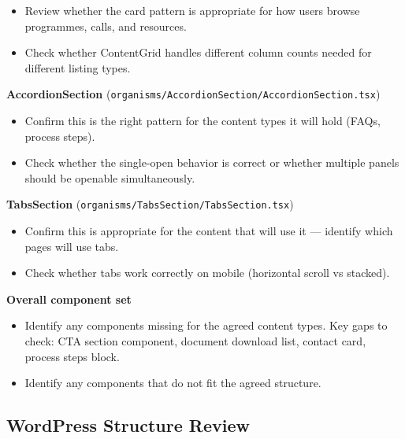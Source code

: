 \documentclass[12pt,a4paper]{article}
\begin{document}
\begin{itemize}
    \item[$\square$] Review whether the card pattern is appropriate for how users browse programmes, calls, and resources.
    \item[$\square$] Check whether ContentGrid handles different column counts needed for different listing types.
\end{itemize}

\vspace{0.8em}
\noindent\textbf{AccordionSection} (\texttt{organisms/AccordionSection/AccordionSection.tsx})

\begin{itemize}
    \item[$\square$] Confirm this is the right pattern for the content types it will hold (FAQs, process steps).
    \item[$\square$] Check whether the single-open behavior is correct or whether multiple panels should be openable simultaneously.
\end{itemize}

\vspace{0.8em}
\noindent\textbf{TabsSection} (\texttt{organisms/TabsSection/TabsSection.tsx})

\begin{itemize}
    \item[$\square$] Confirm this is appropriate for the content that will use it --- identify which pages will use tabs.
    \item[$\square$] Check whether tabs work correctly on mobile (horizontal scroll vs stacked).
\end{itemize}

\vspace{0.8em}
\noindent\textbf{Overall component set}

\begin{itemize}
    \item[$\square$] Identify any components missing for the agreed content types. Key gaps to check: CTA section component, document download list, contact card, process steps block.
    \item[$\square$] Identify any components that do not fit the agreed structure.
\end{itemize}

\subsection{WordPress Structure Review}
\end{document}
